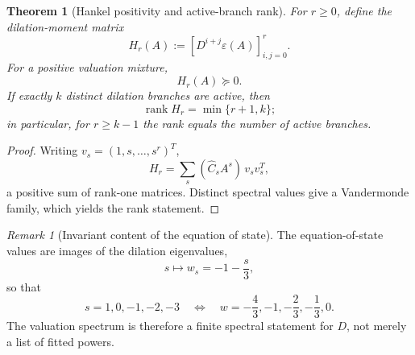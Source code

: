 \documentclass[11pt,a4paper]{article}
\def\Dil{D}%
\numberwithin{equation}{section}
\theoremstyle{definition}
\theoremstyle{plain}
\newtheorem{theorem}[criterion]{Theorem}
\theoremstyle{remark}
\newtheorem{remark}[criterion]{Remark}
\newcommand{\Dil}{\mathscr{D}}
\begin{document}
\begin{theorem}[Hankel positivity and active-branch rank]
For \(r\ge0\), define the dilation-moment matrix
\begin{equation}
H_r(A):=
\left[\Dil^{i+j}\varepsilon(A)\right]_{i,j=0}^{r}.
\end{equation}
For a positive valuation mixture,
\begin{equation}
\boxed{H_r(A)\succeq0.}
\end{equation}
If exactly \(k\) distinct dilation branches are active, then
\begin{equation}
\operatorname{rank}H_r=\min\{r+1,k\};
\end{equation}
in particular, for \(r\ge k-1\) the rank equals the number of active branches.
\end{theorem}
\begin{proof}
Writing \(v_s=(1,s,\ldots,s^r)^T\),
\begin{equation}
H_r=\sum_s (\widehat C_sA^s)\,v_sv_s^T,
\end{equation}
a positive sum of rank-one matrices. Distinct spectral values give a Vandermonde family, which yields the rank statement.
\end{proof}

\begin{remark}[Invariant content of the equation of state]
The equation-of-state values are images of the dilation eigenvalues,
\begin{equation}
s\longmapsto w_s=-1-\frac{s}{3},
\end{equation}
so that
\begin{equation}
s=1,0,-1,-2,-3
\quad\Longleftrightarrow\quad
w=-\frac43,-1,-\frac23,-\frac13,0.
\end{equation}
The valuation spectrum is therefore a finite spectral statement for \(\Dil\), not merely a list of fitted powers.
\end{remark}
\end{document}
